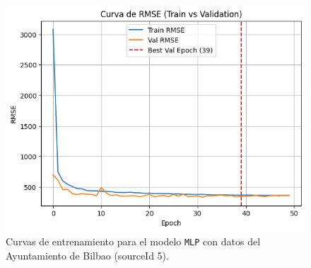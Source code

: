 \begin{figure}[H]
\begin{minipage}{0.48\textwidth}
		\includegraphics[width=\linewidth]{includes/cap5/graphs/sid5_mlp_rmse.png}
	\end{minipage}
	\caption{Curvas de entrenamiento para el modelo \texttt{MLP} con datos del Ayuntamiento de Bilbao (sourceId 5).}
	\label{fig:curvas_sid5_mlp}
\end{figure}

